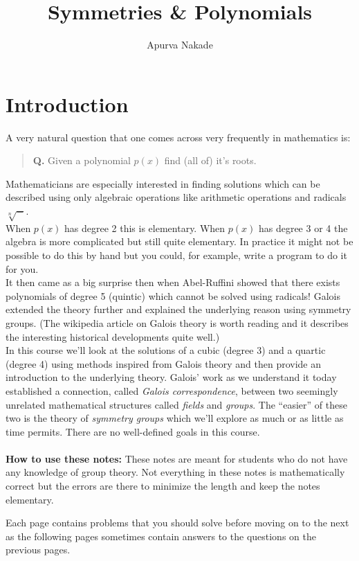 
\title{Symmetries \& Polynomials}
\author{\small{Apurva Nakade}}
\date{}
\maketitle
\section{Introduction}

A very natural question that one comes across very frequently in mathematics is: 
  \begin{quote}
    \textbf{Q.} Given a polynomial $ p(x)$ find (all of) it's roots.
  \end{quote}
Mathematicians are especially interested in finding solutions which can be described using only algebraic operations like arithmetic operations and radicals $ \sqrt[n]{-}$. \\

When $ p(x)$ has degree 2 this is elementary. When $ p(x)$ has degree 3 or 4 the algebra is more complicated but still quite elementary. In practice it might not be possible to do this by hand but you could, for example, write a program to do it for you.\\

It then came as a big surprise then when Abel-Ruffini showed that there exists polynomials of degree 5 (quintic) which cannot be solved using radicals! Galois extended the theory further and explained the underlying reason using symmetry groups. (The wikipedia article on Galois theory is worth reading and it describes the interesting historical developments quite well.)\\

In this course we'll look at the solutions of a cubic (degree 3) and a quartic (degree 4) using methods inspired from Galois theory and then provide an introduction to the underlying theory. Galois' work as we understand it today established a connection, called \emph{Galois correspondence}, between two seemingly unrelated mathematical structures called \emph{fields} and \emph{groups}. The ``easier'' of these two is the theory of \emph{symmetry groups} which we'll explore as much or as little as time permits. There are no well-defined goals in this course.\\\\

\noindent \textbf{How to use these notes:}
These notes are meant for students who do not have any knowledge of group theory. Not everything in these notes is mathematically correct but the errors are there to minimize the length and keep the notes elementary.

Each page contains problems that you should solve before moving on to the next as the following pages sometimes contain answers to the questions on the previous pages. 